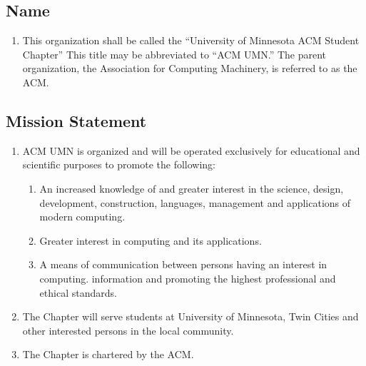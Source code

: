\subsection{Name}
\begin{enumerate}
	\item This organization shall be called the ``University of Minnesota ACM Student Chapter'' This title may be abbreviated to ``ACM UMN.'' The parent organization, the Association for Computing Machinery, is referred to as the ACM.
\end{enumerate}

\subsection{Mission Statement}
\begin{enumerate}
	\item ACM UMN is organized and will be operated exclusively for educational and scientific purposes to promote the following:
		\begin{enumerate}
			\item An increased knowledge of and greater interest in the science, design, development, construction, languages, management and applications of modern computing.
			\item Greater interest in computing and its applications.
			\item A means of communication between persons having an interest in computing. information and promoting the highest professional and ethical standards.
		\end{enumerate}
	\item The Chapter will serve students at University of Minnesota, Twin Cities and other interested persons in the local community.
	\item The Chapter is chartered by the ACM.
\end{enumerate}
